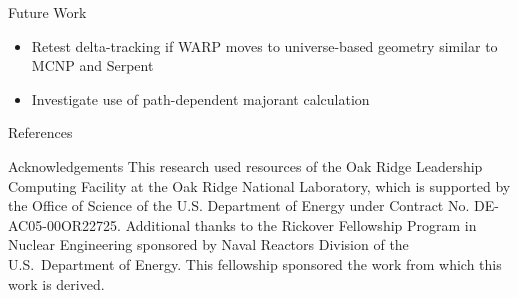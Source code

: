 \documentclass[final]{beamer}
\begin{document}
\begin{frame}{}
\begin{columns}[t]
\begin{column}{.3\linewidth}
\begin{block}{\large Future Work}
\begin{itemize}
				\item{Retest delta-tracking if WARP moves to universe-based geometry similar to MCNP and Serpent}
          			\item Investigate use of path-dependent majorant calculation
          		\end{itemize}
        	\end{block}
			\vfill
        	\begin{block}{\large References}
			\printbibliography
        	\end{block}
			\vfill
        	\begin{block}{\large Acknowledgements}
		\justifying
This research used resources of the Oak Ridge Leadership Computing Facility at the Oak Ridge National Laboratory, which is supported by the Office of Science of the U.S. Department of Energy under Contract No. DE-AC05-00OR22725. Additional thanks to the Rickover Fellowship Program in Nuclear Engineering sponsored by Naval Reactors Division of the U.S.\ Department of Energy. This fellowship sponsored the work from which this work is derived. 
        	\end{block}
      \end{column}
    \end{columns}
  \end{frame}
\end{document}
